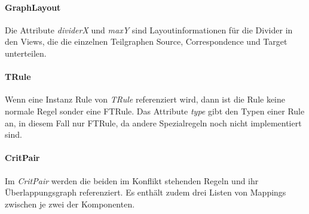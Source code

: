 \paragraph{GraphLayout}
Die Attribute \emph{dividerX} und \emph{maxY} sind Layoutinformationen für die Divider in den Views, die die einzelnen Teilgraphen Source, Correspondence und Target unterteilen.
\paragraph{TRule}
Wenn eine Instanz Rule von \emph{TRule} referenziert wird, dann ist die Rule keine normale Regel sonder eine FTRule. Das Attribute \emph{type} gibt den Typen einer Rule an, in diesem Fall nur FTRule, da andere Spezialregeln noch nicht implementiert sind.
\paragraph{CritPair}
Im \emph{CritPair} werden die beiden im Konflikt stehenden Regeln und ihr Überlappungsgraph referenziert.
Es enthält zudem drei Listen von Mappings zwischen je zwei der Komponenten.